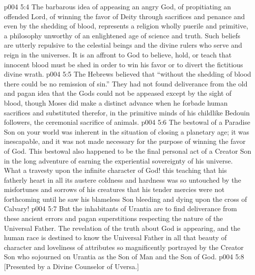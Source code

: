 \pc \vs p004 5:4 The barbarous idea of appeasing an angry God, of propitiating an offended Lord, of winning the favor of Deity through sacrifices and penance and even by the shedding of blood, represents a religion wholly puerile and primitive, a philosophy unworthy of an enlightened age of science and truth. Such beliefs are utterly repulsive to the celestial beings and the divine rulers who serve and reign in the universes. It is an affront to God to believe, hold, or teach that innocent blood must be shed in order to win his favor or to divert the fictitious divine wrath.
\vs p004 5:5 The Hebrews believed that “without the shedding of blood there could be no remission of sin.” They had not found deliverance from the old and pagan idea that the Gods could not be appeased except by the sight of blood, though Moses did make a distinct advance when he forbade human sacrifices and substituted therefor, in the primitive minds of his childlike Bedouin followers, the ceremonial sacrifice of animals.
\vs p004 5:6 The bestowal of a Paradise Son on your world was inherent in the situation of closing a planetary age; it was inescapable, and it was not made necessary for the purpose of winning the favor of God. This bestowal also happened to be the final personal act of a Creator Son in the long adventure of earning the experiential sovereignty of his universe. What a travesty upon the infinite character of God! this teaching that his fatherly heart in all its austere coldness and hardness was so untouched by the misfortunes and sorrows of his creatures that his tender mercies were not forthcoming until he saw his blameless Son bleeding and dying upon the cross of Calvary!
\vs p004 5:7 But the inhabitants of Urantia are to find deliverance from these ancient errors and pagan superstitions respecting the nature of the Universal Father. The revelation of the truth about God is appearing, and the human race is destined to know the Universal Father in all that beauty of character and loveliness of attributes so magnificently portrayed by the Creator Son who sojourned on Urantia as the Son of Man and the Son of God.
\vsetoff
\vs p004 5:8 [Presented by a Divine Counselor of Uversa.]
